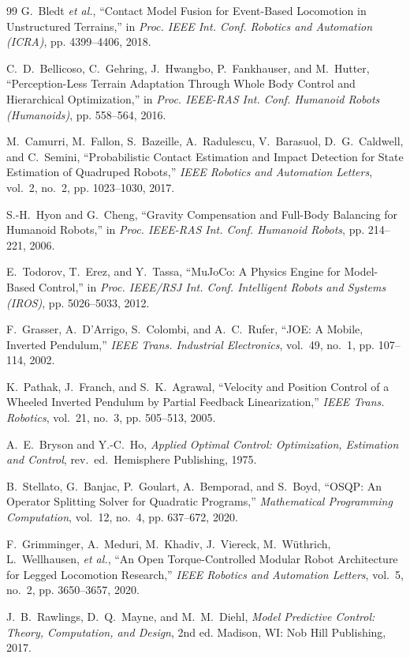 \documentclass[conference]{IEEEtran}
\begin{document}
\begin{thebibliography}{99}
G.~Bledt \emph{et al.},
``Contact Model Fusion for Event-Based Locomotion in Unstructured Terrains,''
in \emph{Proc. IEEE Int. Conf. Robotics and Automation (ICRA)}, pp. 4399--4406, 2018.

C.~D.~Bellicoso, C.~Gehring, J.~Hwangbo, P.~Fankhauser, and M.~Hutter,
``Perception-Less Terrain Adaptation Through Whole Body Control and Hierarchical Optimization,''
in \emph{Proc. IEEE-RAS Int. Conf. Humanoid Robots (Humanoids)}, pp. 558--564, 2016.

M.~Camurri, M.~Fallon, S.~Bazeille, A.~Radulescu, V.~Barasuol, D.~G.~Caldwell, and C.~Semini,
``Probabilistic Contact Estimation and Impact Detection for State Estimation of Quadruped Robots,''
\emph{IEEE Robotics and Automation Letters}, vol.~2, no.~2, pp. 1023--1030, 2017.

S.-H.~Hyon and G.~Cheng,
``Gravity Compensation and Full-Body Balancing for Humanoid Robots,''
in \emph{Proc. IEEE-RAS Int. Conf. Humanoid Robots}, pp. 214--221, 2006.

E.~Todorov, T.~Erez, and Y.~Tassa,
``MuJoCo: A Physics Engine for Model-Based Control,''
in \emph{Proc. IEEE/RSJ Int. Conf. Intelligent Robots and Systems (IROS)}, pp. 5026--5033, 2012.

F.~Grasser, A.~D'Arrigo, S.~Colombi, and A.~C.~Rufer,
``JOE: A Mobile, Inverted Pendulum,''
\emph{IEEE Trans. Industrial Electronics}, vol.~49, no.~1, pp. 107--114, 2002.

K.~Pathak, J.~Franch, and S.~K.~Agrawal,
``Velocity and Position Control of a Wheeled Inverted Pendulum by Partial Feedback Linearization,''
\emph{IEEE Trans. Robotics}, vol.~21, no.~3, pp. 505--513, 2005.

A.~E.~Bryson and Y.-C.~Ho,
\emph{Applied Optimal Control: Optimization, Estimation and Control}, rev.~ed.\ Hemisphere Publishing, 1975.

B.~Stellato, G.~Banjac, P.~Goulart, A.~Bemporad, and S.~Boyd,
``OSQP: An Operator Splitting Solver for Quadratic Programs,''
\emph{Mathematical Programming Computation}, vol.~12, no.~4, pp. 637--672, 2020.

F.~Grimminger, A.~Meduri, M.~Khadiv, J.~Viereck, M.~W\"{u}thrich, L.~Wellhausen, \emph{et al.},
``An Open Torque-Controlled Modular Robot Architecture for Legged Locomotion Research,''
\emph{IEEE Robotics and Automation Letters}, vol.~5, no.~2, pp. 3650--3657, 2020.

J.~B.~Rawlings, D.~Q.~Mayne, and M.~M.~Diehl,
\emph{Model Predictive Control: Theory, Computation, and Design}, 2nd ed.
Madison, WI: Nob Hill Publishing, 2017.

\end{thebibliography}
\end{document}
